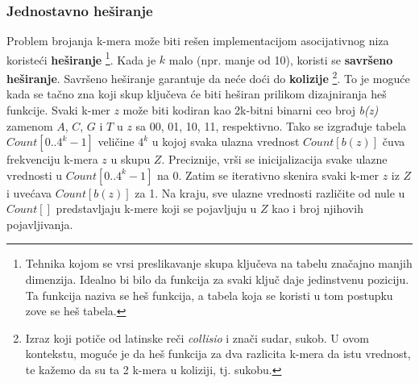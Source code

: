 \documentclass[12pt,oneside]{memoir}
\begin{document}
\subsubsection{Jednostavno heširanje}
Problem brojanja k-mera može biti rešen implementacijom asocijativnog niza koristeći \textbf{heširanje} \footnote{Tehnika kojom se vrsi preslikavanje skupa ključeva na tabelu značajno manjih dimenzija. Idealno bi bilo da funkcija za svaki ključ
daje jedinstvenu poziciju. Ta funkcija naziva se heš funkcija, a tabela koja se koristi u tom
postupku zove se heš tabela.}. Kada je $k$ malo (npr. manje od 10), koristi se \textbf{savršeno heširanje}. Savršeno heširanje garantuje da neće doći do \textbf{kolizije}  \footnote{Izraz koji potiče od latinske reči \textit{collisio} i znači sudar, sukob. U ovom kontekstu, moguće je da heš funkcija za dva razlicita k-mera da istu vrednost, te kažemo da su ta 2 k-mera u koliziji, tj. sukobu.}. To je moguće kada se tačno zna koji skup ključeva će biti heširan prilikom dizajniranja heš funkcije. Svaki k-mer $z$ može biti kodiran kao 2k-bitni binarni ceo broj \textit{b(z)} zamenom $A$, $C$, $G$ i $T$ u $z$ sa 00, 01, 10, 11, respektivno. Tako se izgrađuje tabela $Count[0..4^k - 1]$ veličine $4^k$ u kojoj svaka ulazna vrednost $Count[b(z)]$ čuva frekvenciju k-mera $z$ u skupu $Z$. Preciznije, vrši se inicijalizacija svake ulazne vrednosti u $Count[0..4^k - 1]$ na 0. Zatim se iterativno skenira svaki k-mer $z$ iz $Z$ i uvećava $Count[b(z)]$ za 1. Na kraju, sve ulazne vrednosti različite od nule u $Count[]$ predstavljaju k-mere koji se pojavljuju u $Z$ kao i broj njihovih pojavljivanja.
\begin{comment}
Slika \ref{fig:5}(a) predstavlja primer koji ilustruje ovaj jednostavni metod prebrojavanja:

\begin{figure}[!ht]
  \centering
  \texttt{[image: 58\_3algoritma.PNG]}
  \caption{Razmatra se skup 4-mera $Z = \{AC; CG; AC; GT; CA; GG; AC; GT\}$: (a) Ilustruje jednostavan metod za brojanje k-mera koji koristi \textit{Count} tabelu veličine 4k. (b) Ilustruje \textit{JellyFish} metod brojanja k-mera koja koristi heš tabelu veličine 7. Heš funkcija je $h(z) = b(z)$ \textit{mod} $7$. Na primer, $GT$ se čuva u tabeli $Count$ sa indeksom 4, jer je $h(GT) = 4$. U ovom primeru se javlja je DNK kolizija. Pošto je i $h(CA) = 4$, $CA$ je u koliziji sa $GT$. Linearnim isprobavanjem $CA$ se ipak čuva u tabeli $Count$ sa indeksom 5. (c) Ilustruje DSK metod brojanja k-mera.
Pretpostavka je da je $h(z) = b(z)$, $n_{list} = 2$ i $n_{sublist} = 2$. DSK deli Z u
4 ($= n_{list} * n_{sublist}$) podliste, a zatim pokreće \textit{JellyFish} algoritam za brojanje k-mera u svakoj podlisti.}
  \label{fig:5}
  \source{\cite{WingKinSung} str. 131, slika 5.8}
\end{figure}

\end{comment}
\end{document}
